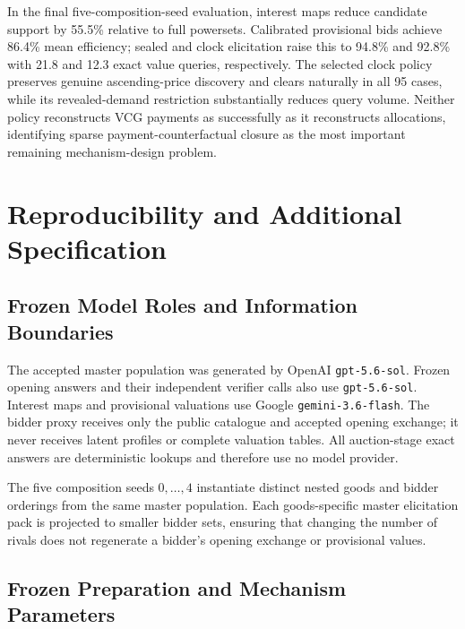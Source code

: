 In the final five-composition-seed evaluation, interest maps reduce candidate support by
55.5\% relative to full powersets. Calibrated provisional bids achieve 86.4\%
mean efficiency; sealed and clock elicitation raise this to 94.8\% and 92.8\%
with 21.8 and 12.3 exact value queries, respectively. The selected clock
policy preserves genuine ascending-price discovery and clears naturally in
all 95 cases, while its revealed-demand restriction substantially reduces
query volume. Neither policy reconstructs VCG payments as successfully as it
reconstructs allocations, identifying sparse payment-counterfactual closure
as the most important remaining mechanism-design problem.

\appendix
\section{Reproducibility and Additional Specification}
\label{app:reproducibility}

\subsection{Frozen Model Roles and Information Boundaries}

The accepted master population was generated by OpenAI
\texttt{gpt-5.6-sol}. Frozen opening answers and their independent verifier
calls also use \texttt{gpt-5.6-sol}. Interest maps and provisional valuations
use Google \texttt{gemini-3.6-flash}. The bidder proxy receives only the
public catalogue and accepted opening exchange; it never receives latent
profiles or complete valuation tables. All auction-stage exact answers are
deterministic lookups and therefore use no model provider.

The five composition seeds \(0,\ldots,4\) instantiate distinct nested goods
and bidder orderings from the same master population. Each goods-specific
master elicitation pack is projected to smaller bidder sets, ensuring that
changing the number of rivals does not regenerate a bidder's opening exchange
or provisional values.

\subsection{Frozen Preparation and Mechanism Parameters}

